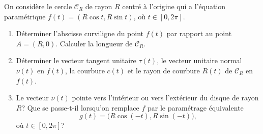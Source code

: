 \begin{exercice}\label{exoCourbesSurfaces0008}

On considère le cercle ${\mathcal{C}}_R$  de rayon $R$ centré à l'origine qui a l'équation paramétrique $f(t)   = (R \cos t, R \sin t) $, où $ t \in [0, 2 \pi]$.  

\begin{enumerate}
	\item
Déterminer l'abscisse curviligne du point $f(t)$ par rapport au point $A = (R, 0)$. Calculer la longueur de ${\mathcal{C}}_R$.
\item

Déterminer  le vecteur tangent unitaire $ {\tau}(t)$,  le vecteur unitaire normal $\nu(t)$ en $f(t)$, la courbure $c(t)$ et le rayon de courbure $R(t)$ de ${\mathcal{C}}_R$ en $f(t)$.

\item

	Le vecteur $\nu(t)$  pointe vers l'intérieur ou vers l'extérieur du disque de rayon $R$?  Que se passe-t-il lorsqu'on remplace $f$ par le paramétrage équivalente 
	\begin{equation}
		g(t)   = \big(R \cos (-t), R \sin (-t)\big),
	\end{equation}
	où $t \in [0, 2 \pi]$?
		
\end{enumerate}

\end{exercice}
